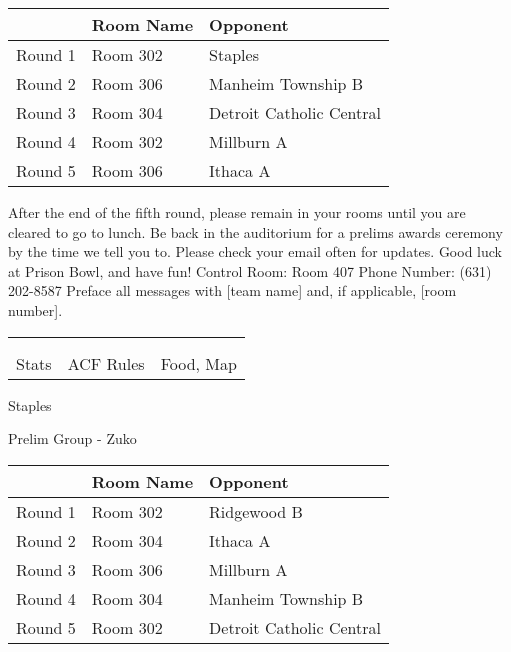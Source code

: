 \documentclass{article}%
\begin{document}
\vspace*{4pt}%
\begin{tabularx}{\textwidth}{|c|Y|Y|}%
\hline%
&Room Name&Opponent\\%
\hline%
Round 1&Room 302&Staples\\%
Round 2&Room 306&Manheim Township B\\%
Round 3&Room 304&Detroit Catholic Central\\%
Round 4&Room 302&Millburn A\\%
Round 5&Room 306&Ithaca A\\%
\hline%
\end{tabularx}%
\vspace*{30pt}%
\linebreak%
After the end of the fifth round, please remain in your rooms until you are cleared to go to lunch. Be back in the auditorium for a prelims awards ceremony by the time we tell you to. Please check your email often for updates. Good luck at Prison Bowl, and have fun!\newline%
\newline%
Control Room: Room 407\newline%
Phone Number: (631) 202{-}8587\newline%
Preface all messages with {[}team name{]} and, if applicable, {[}room number{]}.%
\vspace*{30pt}%
\newline%
%
\begin{tabularx}{\textwidth}{YYY}%
  &  &  \\%
\\%
Stats&ACF Rules&Food, Map\\%
\end{tabularx}%
\newpage%
%
\begin{center}%
\begin{Huge}%
Staples%
\end{Huge}%
\vspace*{12pt}%
\linebreak%
\begin{Large}%
Prelim Group {-} Zuko%
\end{Large}%
\end{center}%
\vspace*{4pt}%
\begin{tabularx}{\textwidth}{|c|Y|Y|}%
\hline%
&Room Name&Opponent\\%
\hline%
Round 1&Room 302&Ridgewood B\\%
Round 2&Room 304&Ithaca A\\%
Round 3&Room 306&Millburn A\\%
Round 4&Room 304&Manheim Township B\\%
Round 5&Room 302&Detroit Catholic Central\\%
\hline%
\end{tabularx}%
\end{document}
